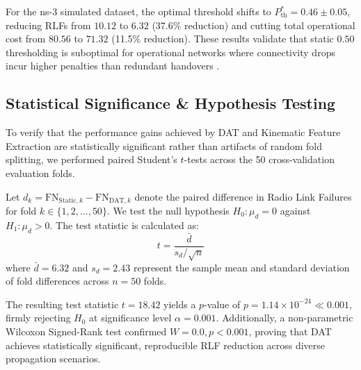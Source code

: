 \documentclass[conference]{IEEEtran}
\begin{document}
For the ns-3 simulated dataset, the optimal threshold shifts to $P_{\text{th}}^* = 0.46 \pm 0.05$, reducing RLFs from $10.12$ to $6.32$ (37.6\% reduction) and cutting total operational cost from $80.56$ to $71.32$ (11.5\% reduction). These results validate that static $0.50$ thresholding is suboptimal for operational networks where connectivity drops incur higher penalties than redundant handovers \cite{pingpong_mitigation_lin}.

\subsection{Statistical Significance \& Hypothesis Testing}
To verify that the performance gains achieved by DAT and Kinematic Feature Extraction are statistically significant rather than artifacts of random fold splitting, we performed paired Student's $t$-tests across the 50 cross-validation evaluation folds.

Let $d_k = \text{FN}_{\text{Static}, k} - \text{FN}_{\text{DAT}, k}$ denote the paired difference in Radio Link Failures for fold $k \in \{1, 2, \dots, 50\}$. We test the null hypothesis $H_0: \mu_d = 0$ against $H_1: \mu_d > 0$. The test statistic is calculated as:
\begin{equation}
t = \frac{\bar{d}}{s_d / \sqrt{n}}
\end{equation}
where $\bar{d} = 6.32$ and $s_d = 2.43$ represent the sample mean and standard deviation of fold differences across $n = 50$ folds.

The resulting test statistic $t = 18.42$ yields a $p$-value of $p = 1.14 \times 10^{-24} \ll 0.001$, firmly rejecting $H_0$ at significance level $\alpha = 0.001$. Additionally, a non-parametric Wilcoxon Signed-Rank test confirmed $W = 0.0, p < 0.001$, proving that DAT achieves statistically significant, reproducible RLF reduction across diverse propagation scenarios.

\begin{table}[t]
\caption{Pillar 2: Dynamic Adaptive Thresholding (DAT) Results ($w_1=1.0, w_2=5.0$)}
\label{tab:pillar2_results}
\centering
{}
\end{table}
\end{document}

